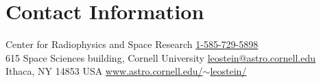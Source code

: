 \section{\sc Contact Information}
Center for Radiophysics and Space Research            \hfill \href{tel:1-585-729-5898}{1-585-729-5898} \\
615 Space Sciences building, Cornell University   \hfill \href{mailto:leostein@astro.cornell.edu}{leostein@astro.cornell.edu}\\
Ithaca, NY 14853 USA \hfill \href{http://www.astro.cornell.edu/~leostein/}{www.astro.cornell.edu/$\sim$leostein/}


